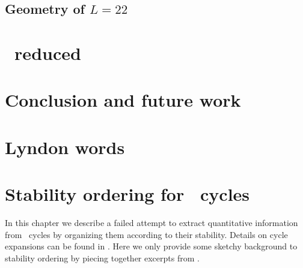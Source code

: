    \section{Geometry of $L=22$ \statesp}
    \label{sec:L22}
    

\chapter{\KS\ reduced \statesp}
    \label{chap:kseRedStSp}	
    


\chapter{Conclusion and future work}
   \label{chap:tobedone}
   
   



\appendix

\chapter{Lyndon words}


\chapter{Stability ordering for \KS\ cycles}
\label{chap:POT} 	
In this chapter we describe a failed attempt to extract
quantitative information from \KSe\ cycles by
organizing them according to their stability.
Details on cycle expansions can be found in .
Here we only provide some sketchy background to stability ordering
by piecing together excerpts from .
	
